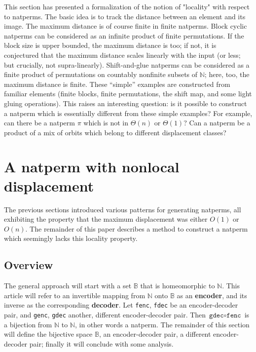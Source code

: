 \documentclass[12pt,reqno]{article}
\begin{document}
This section has presented a formalization of the notion of "locality" with respect to natperms. The basic idea is to track the distance between an element and its image. The maximum distance is of course finite in finite natperms. Block cyclic natperms can be considered as an infinite product of finite permutations. If the block size is upper bounded, the maximum distance is too; if not, it is conjectured that the maximum distance scales linearly with the input (or less; but crucially, not supra-linearly). Shift-and-glue natperms can be considered as a finite product of permutations on countably nonfinite subsets of $\mathbb{N}$; here, too, the maximum distance is finite. These ``simple'' examples are constructed from familiar elements (finite blocks, finite permutations, the shift map, and some light gluing operations). This raises an interesting question: is it possible to construct a natperm which is essentially different from these simple examples? For example, can there be a natperm $\pi$ which is not in $\Theta(n)$ or $\Theta(1)$? Can a natperm be a product of a mix of orbits which belong to different displacement classes?

\section{A natperm with nonlocal displacement}

The previous sections introduced various patterns for generating natperms, all exhibiting the property that the maximum displacement was either $O(1)$ or $O(n)$. The remainder of this paper describes a method to construct a natperm which seemingly lacks this locality property.

\subsection{Overview}

The general approach will start with a set $\mathbb{B}$ that is homeomorphic to $\mathbb{N}$. This article will refer to an invertible mapping from $\mathbb{N}$ onto $\mathbb{B}$ as an \textbf{encoder}, and its inverse as the corresponding \textbf{decoder}. Let \texttt{fenc}, \texttt{fdec} be an encoder-decoder pair, and \texttt{genc}, \texttt{gdec} another, different encoder-decoder pair. Then $\texttt{gdec} \circ \texttt{fenc}$ is a bijection from $\mathbb{N}$ to $\mathbb{N}$, in other words a natperm. The remainder of this section will define the bijective space $\mathbb{B}$, an encoder-decoder pair, a different encoder-decoder pair; finally it will conclude with some analysis.
\end{document}

